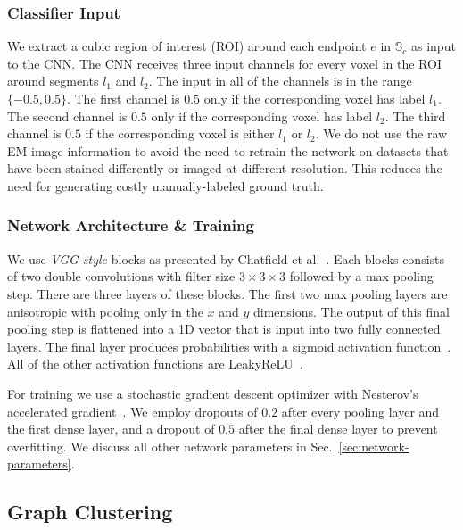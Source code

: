 \subsubsection{Classifier Input}

We extract a cubic region of interest (ROI) around each endpoint $e$ in $\mathbb{S}_c$ as input to the CNN. 
The CNN receives three input channels for every voxel in the ROI around segments $l_1$ and $l_2$. 
The input in all of the channels is in the range $\{-0.5, 0.5\}$. 
The first channel is $0.5$ only if the corresponding voxel has label $l_1$. 
The second channel is $0.5$ only if the corresponding voxel has label $l_2$. 
The third channel is $0.5$ if the corresponding voxel is either $l_1$ or $l_2$.
We do not use the raw EM image information to avoid the need to retrain the network on datasets that have been stained differently or imaged at different resolution. 
This reduces the need for generating costly manually-labeled ground truth. 

\subsubsection{Network Architecture \& Training}

We use \textit{VGG-style} blocks as presented by Chatfield et al.~\cite{chatfield2014return}. 
Each blocks consists of two double convolutions with filter size $3\times3\times3$ followed by a max pooling step. 
There are three layers of these blocks. 
The first two max pooling layers are anisotropic with pooling only in the $x$ and $y$ dimensions. 
The output of this final pooling step is flattened into a 1D vector that is input into two fully connected layers. 
The final layer produces probabilities with a sigmoid activation function~\cite{funahashi1989approximate}. 
All of the other activation functions are LeakyReLU~\cite{maas2013rectifier}.

For training we use a stochastic gradient descent optimizer with Nesterov's accelerated gradient~\cite{nesterov1983method}. 
We employ dropouts of $0.2$ after every pooling layer and the first dense layer, and a dropout of $0.5$ after the final dense layer to prevent overfitting. 
We discuss all other network parameters in Sec.~\ref{sec:network-parameters}.


\subsection{Graph Clustering}

